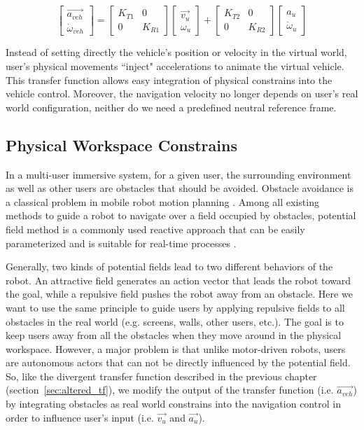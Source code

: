 \begin{equation}
\begin{bmatrix}
\overrightarrow{a_{veh}} \\ \dot{\omega}_{veh}
\end{bmatrix}=
\begin{bmatrix}
K_{T1} & 0 \\ 0 & K_{R1}
\end{bmatrix}
\begin{bmatrix}
\overrightarrow{v_{u}} \\ \omega_{u}
\end{bmatrix} + 
\begin{bmatrix}
K_{T2} & 0 \\ 0 & K_{R2}
\end{bmatrix}
\begin{bmatrix}
a_{u} \\ \dot{\omega}_{u}
\end{bmatrix}
\end{equation}

Instead of setting directly the vehicle's position or velocity in the virtual world, user's physical movements ``inject" accelerations to animate the virtual vehicle. This transfer function allows easy integration of physical constrains into the vehicle control. Moreover, the navigation velocity no longer depends on user's real world configuration, neither do we need a predefined neutral reference frame.


\subsection{Physical Workspace Constrains}
In a multi-user immersive system, for a given user, the surrounding environment as well as other users are obstacles that should be avoided. Obstacle avoidance is a classical problem in mobile robot motion planning \citep{Latombe2012Robot}. Among all existing methods to guide a robot to navigate over a field occupied by obstacles, potential field method is a commonly used reactive approach that can be easily parameterized and is suitable for real-time processes \citep{Khatib1986Real, Hellstrom2011Robot}.

Generally, two kinds of potential fields lead to two different behaviors of the robot. An attractive field generates an action vector that leads the robot toward the goal, while a repulsive field pushes the robot away from an obstacle. Here we want to use the same principle to guide users by applying repulsive fields to all obstacles in the real world (e.g. screens, walls, other users, etc.). The goal is to keep users away from all the obstacles when they move around in the physical workspace. However, a major problem is that unlike motor-driven robots, users are autonomous actors that can not be directly influenced by the potential field. So, like the divergent transfer function described in the previous chapter (section~\ref{sec:altered_tf}), we modify the output of the transfer function (i.e. $\overrightarrow{a_{veh}}$) by integrating obstacles as real world constrains into the navigation control in order to influence user's input (i.e. $\overrightarrow{v_{u}}$ and $\overrightarrow{a_{u}}$).


